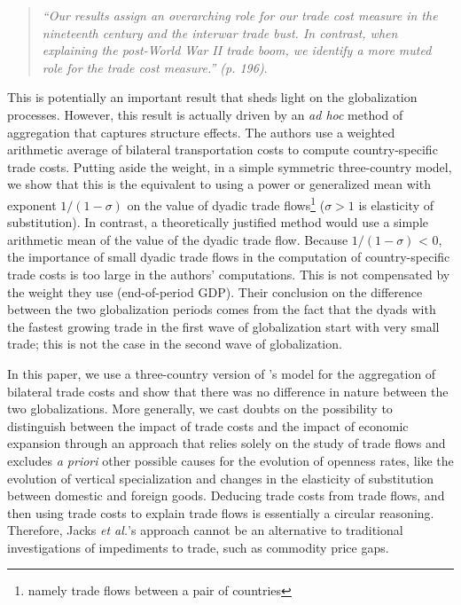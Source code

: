 \documentclass{article}
\begin{document}
\begin{quote}
\emph{``Our results assign an overarching role for our trade
cost measure in the nineteenth century and the interwar trade
bust. In contrast, when explaining the post-World War II trade
boom, we identify a more muted role for the trade cost
measure.'' (p. 196)}.
\end{quote}

This is potentially an important result that sheds light on the globalization processes.
However, this result is actually driven by an \textit{ad hoc} method of aggregation that captures structure effects.
The authors use a weighted arithmetic average of bilateral transportation costs to compute country-specific trade costs. Putting aside the weight, in a simple symmetric three-country model, we show that this is the equivalent to using a power or generalized mean with exponent $1/(1-\sigma)$ on the value of dyadic trade flows\footnote{namely trade flows between a pair of countries} ($\sigma > 1$ is elasticity of substitution).
In contrast, a theoretically justified method would use a simple arithmetic mean of the value of the dyadic trade flow. 
Because $1/(1-\sigma)$ < 0, the importance of small dyadic trade flows in the computation of country-specific trade costs is too large in the authors' computations.
This is not compensated by the weight they use (end-of-period GDP).
Their conclusion on the difference between the two globalization periods comes from the fact that the dyads with the fastest growing trade in the first wave of globalization start with very small trade; this is not the case in the second wave of globalization.

In this paper, we use a three-country version of \cite{AW2003}'s model for the aggregation of bilateral trade costs and show that there was no difference in nature between the two globalizations.
More generally, we cast doubts on the possibility to distinguish between the impact of trade costs and the impact of economic expansion through an approach that relies solely on the study of trade flows and excludes \textit{a priori} other possible causes for the evolution of openness rates, like the evolution of vertical specialization and changes in the elasticity of substitution between domestic and foreign goods.
Deducing trade costs from trade flows, and then using trade costs to explain trade flows is essentially a circular reasoning.
Therefore, Jacks \textit{et al.}'s approach cannot be an alternative to traditional investigations of impediments to trade, such as commodity price gaps.
\end{document}
